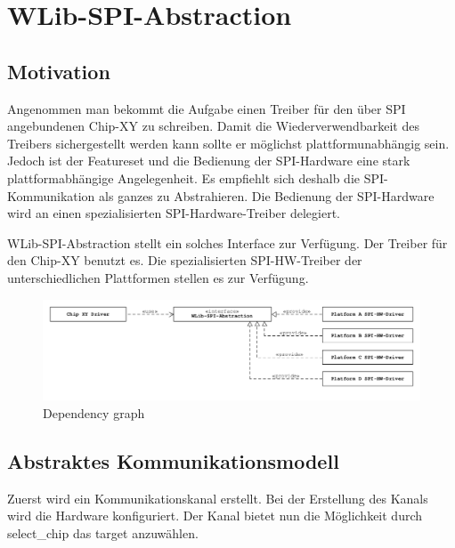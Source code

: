 \documentclass[12pt,a4paper]{article}
\begin{document}
\section{WLib-SPI-Abstraction}

\subsection{Motivation}
    Angenommen man bekommt die Aufgabe einen Treiber für den über SPI angebundenen Chip-XY zu schreiben.
    Damit die Wiederverwendbarkeit des Treibers sichergestellt werden kann sollte er möglichst plattformunabhängig sein.
    Jedoch ist der Featureset und die Bedienung der SPI-Hardware eine stark plattformabhängige Angelegenheit.
    Es empfiehlt sich deshalb die SPI-Kommunikation als ganzes zu Abstrahieren.
    Die Bedienung der SPI-Hardware wird an einen spezialisierten SPI-Hardware-Treiber delegiert.

    WLib-SPI-Abstraction stellt ein solches Interface zur Verfügung.
    Der Treiber für den Chip-XY benutzt es.
    Die spezialisierten SPI-HW-Treiber der unterschiedlichen Plattformen stellen es zur Verfügung.
            
    \begin{figure}[h]
        \centering
        \includegraphics[width=0.7\linewidth]{fig/dependency}
        \caption{Dependency graph}
        \label{fig:dependency}
    \end{figure}
        
        
\subsection{Abstraktes Kommunikationsmodell}

Zuerst wird ein Kommunikationskanal erstellt. Bei der Erstellung des Kanals wird die Hardware konfiguriert.
Der Kanal bietet nun die Möglichkeit durch select_chip das target anzuwählen.
 
\end{document}
